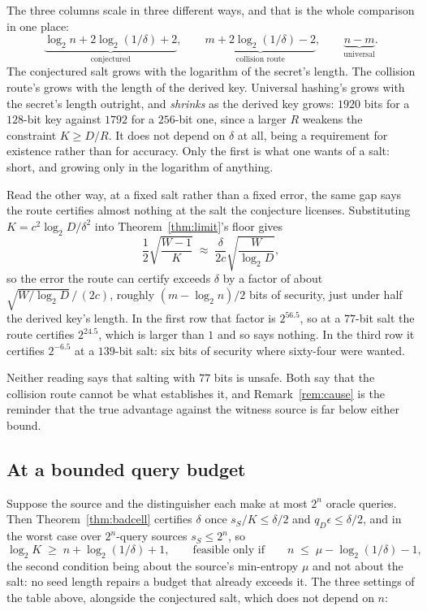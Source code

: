 \documentclass{aicr-solution}
\begin{document}
The three columns scale in three different ways, and that is the whole comparison in one place:
\[
  \underbrace{\log_2 n + 2\log_2(1/\delta) + 2}_{\text{conjectured}}, \qquad
  \underbrace{m + 2\log_2(1/\delta) - 2}_{\text{collision route}}, \qquad
  \underbrace{n - m}_{\text{universal}} .
\]
The conjectured salt grows with the logarithm of the secret's length. The collision route's grows
with the length of the derived key. Universal hashing's grows with the secret's length outright, and
\emph{shrinks} as the derived key grows: $1920$ bits for a $128$-bit key against $1792$ for a
$256$-bit one, since a larger $R$ weakens the constraint $K \ge D/R$. It does not depend on $\delta$
at all, being a requirement for existence rather than for accuracy. Only the first is what one wants
of a salt: short, and growing only in the logarithm of anything.

Read the other way, at a fixed salt rather than a fixed error, the same gap says the route
certifies almost nothing at the salt the conjecture licenses. Substituting
$K = c^{2}\log_2 D/\delta^{2}$ into Theorem~\ref{thm:limit}'s floor gives
\[
  \frac12\sqrt{\frac{W-1}{K}} \;\approx\; \frac{\delta}{2c}\sqrt{\frac{W}{\log_2 D}} ,
\]
so the error the route can certify exceeds $\delta$ by a factor of about
$\sqrt{W/\log_2 D}\,/\,(2c)$, roughly $(m - \log_2 n)/2$ bits of security, just under half the
derived key's length. In the first row that factor is $2^{56.5}$, so at a $77$-bit salt the route certifies
$2^{24.5}$, which is larger than $1$ and so says nothing. In the third row it certifies $2^{-6.5}$
at a $139$-bit salt: six bits of security where sixty-four were wanted.

Neither reading says that salting with $77$ bits is unsafe. Both say that the collision route cannot
be what establishes it, and Remark~\ref{rem:cause} is the reminder that the true advantage against
the witness source is far below either bound.

\subsection*{At a bounded query budget}

Suppose the source and the distinguisher each make at most $2^{n}$ oracle queries. Then
Theorem~\ref{thm:badcell} certifies $\delta$ once $s_S/K \le \delta/2$ and $q_D\epsilon \le \delta/2$,
and in the worst case over $2^{n}$-query sources $s_S \le 2^{n}$, so
\begin{equation}\label{eq:qsalt}
  \log_2 K \;\ge\; n + \log_2(1/\delta) + 1 ,
  \qquad\text{feasible only if}\qquad
  n \;\le\; \mu - \log_2(1/\delta) - 1 ,
\end{equation}
the second condition being about the source's min-entropy $\mu$ and not about the salt: no seed
length repairs a budget that already exceeds it. The three settings of the table above, alongside
the conjectured salt, which does not depend on $n$:
\end{document}
